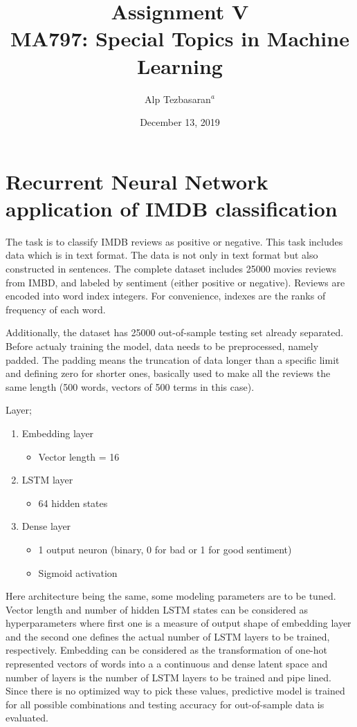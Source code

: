 \documentclass[11pt]{article}
\title{ \bf{Assignment V \\ MA797: Special Topics in Machine Learning}}
\author{Alp Tezbasaran$^{a}$}
\affil{\textit{$^{a}$Department of Nuclear Engineering NCSU, alptezbasaran@ncsu.edu}}
\date{December 13, 2019}
\begin{document}
\maketitle

\section{Recurrent Neural Network application of IMDB classification}

The task is to classify IMDB reviews as positive or negative. This task includes data which is in text format. The data is not only in text format but also constructed in sentences. The complete dataset includes 25000 movies reviews from IMBD, and labeled by sentiment (either positive or negative). Reviews are encoded into word index integers. For convenience, indexes are the ranks of frequency of each word. \medskip

Additionally, the dataset has 25000 out-of-sample testing set already separated. Before actualy training the model, data needs to be preprocessed, namely padded. The padding means the truncation of data longer than a specific limit and defining zero for shorter ones, basically used to make all the reviews the same length (500 words, vectors of 500 terms in this case).\medskip

Layer;
\begin{enumerate}
    \item Embedding layer
    \begin{itemize}
        \item Vector length = 16
    \end{itemize}
    \item LSTM layer
    \begin{itemize}
        \item 64 hidden states
    \end{itemize}
    \item Dense layer
    \begin{itemize}
        \item 1 output neuron (binary, 0 for bad or 1 for good sentiment)
        \item Sigmoid activation
    \end{itemize}
\end{enumerate}

Here architecture being the same, some modeling parameters are to be tuned. Vector length and number of hidden LSTM states can be considered as hyperparameters where first one is a measure of output shape of embedding layer and the second one defines the actual number of LSTM layers to be trained, respectively. Embedding can be considered as the transformation of one-hot represented vectors of words into a a continuous and dense latent space and number of layers is the number of LSTM layers to be trained and pipe lined. Since there is no optimized way to pick these values, predictive model is trained for all possible combinations and testing accuracy for out-of-sample data is evaluated.
\end{document}

